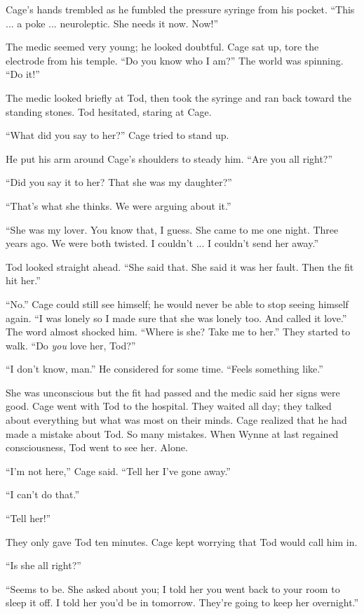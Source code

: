 Cage's hands trembled as he fumbled the pressure syringe from his pocket. ``This ... a poke ... neuroleptic. She needs it now. Now!''

The medic seemed very young; he looked doubtful. Cage sat up, tore the electrode from his temple. ``Do you know who I am?'' The world was spinning. ``Do it!''

The medic looked briefly at Tod, then took the syringe and ran back toward the standing stones. Tod hesitated, staring at Cage.

``What did you say to her?'' Cage tried to stand up.

He put his arm around Cage's shoulders to steady him. ``Are you all right?''

``Did you say it to her? That she was my daughter?''

``That's what she thinks. We were arguing about it.''

``She was my lover. You know that, I guess. She came to me one night. Three years ago. We were both twisted. I couldn't ... I couldn't send her away.''

Tod looked straight ahead. ``She said that. She said it was her fault. Then the fit hit her.''

``No.'' Cage could still see himself; he would never be able to stop seeing himself again. ``I was lonely so I made sure that she was lonely too. And called it love.'' The word almost shocked him. ``Where is she? Take me to her.'' They started to walk. ``Do \textit{you} love her, Tod?''

``I don't know, man.'' He considered for some time. ``Feels something like.''

She was unconscious but the fit had passed and the medic said her signs were good. Cage went with Tod to the hospital. They waited all day; they talked about everything but what was most on their minds. Cage realized that he had made a mistake about Tod. So many mistakes. When Wynne at last regained consciousness, Tod went to see her. Alone.

``I'm not here,'' Cage said. ``Tell her I've gone away.''

``I can't do that.''

``Tell her!''

They only gave Tod ten minutes. Cage kept worrying that Tod would call him in.

``Is she all right?''

``Seems to be. She asked about you; I told her you went back to your room to sleep it off. I told her you'd be in tomorrow. They're going to keep her overnight.''

